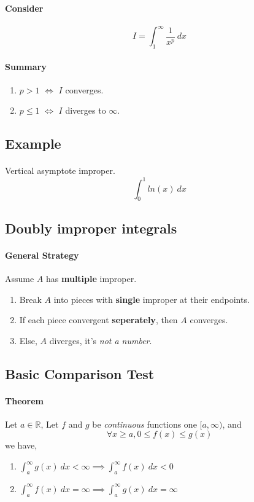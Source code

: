 \documentclass{article}
\newcommand{\R}[0]{\mathbb{R}}
\newcommand{\theorem}[0]{\paragraph{Theorem}}
\begin{document}
\paragraph{Consider}
\[
	I = \int_{1}^{\infty} \frac{1}{x^p}\ dx
\]
\paragraph{Summary}
\begin{enumerate}
	\item $p > 1$ $\iff$ $I$ converges.
	\item $p \leq 1 $ $\iff$ $I$ diverges to $\infty$.
\end{enumerate}

\subsection{Example}
\paragraph{}Vertical asymptote improper.
\[
\int_0^1 {ln(x)}\ dx
\]

\subsection{Doubly improper integrals}
\paragraph{General Strategy} Assume $A$ has \textbf{multiple} improper.
\begin{enumerate}
	\item Break $A$ into pieces with \textbf{single} improper at their endpoints.
	\item If each piece convergent \textbf{seperately}, then $A$ converges.
	\item Else, $A$ diverges, it's \emph{not a number}.
\end{enumerate}

\subsection{Basic Comparison Test}
\theorem Let $a \in \R$,
\newline Let $f$ and $g$ be \emph{continuous} functions one $[a,\infty)$, and 
\[
	\forall x \geq a, 0 \leq f(x) \leq g(x)
\]
we have,
\begin{enumerate}
	\item $\int_a^{\infty}g(x)\ dx < \infty \implies \int_a^{\infty}f(x)\ dx < 0$
	\item $\int_a^{\infty}f(x)\ dx = \infty \implies \int_a^{\infty}g(x)\ dx = \infty$
\end{enumerate}
\end{document}
